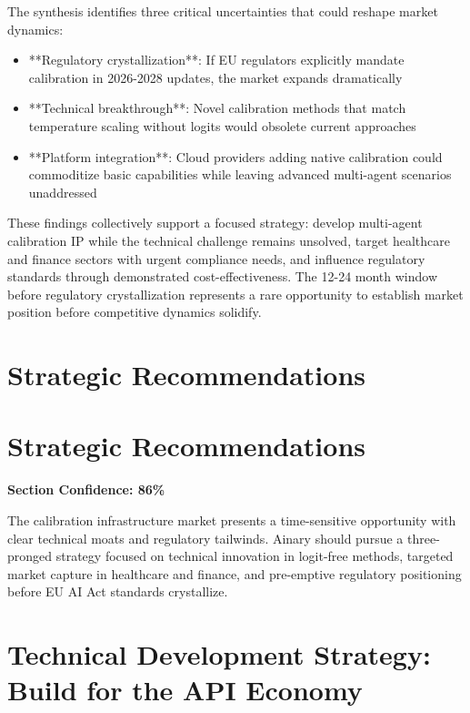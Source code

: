 \documentclass[a4paper,11pt]{article}
\begin{document}
The synthesis identifies three critical uncertainties that could reshape market dynamics:


\begin{itemize}
  \item **Regulatory crystallization**: If EU regulators explicitly mandate calibration in 2026-2028 updates, the market expands dramatically
  \item **Technical breakthrough**: Novel calibration methods that match temperature scaling without logits would obsolete current approaches
  \item **Platform integration**: Cloud providers adding native calibration could commoditize basic capabilities while leaving advanced multi-agent scenarios unaddressed
\end{itemize}

These findings collectively support a focused strategy: develop multi-agent calibration IP while the technical challenge remains unsolved, target healthcare and finance sectors with urgent compliance needs, and influence regulatory standards through demonstrated cost-effectiveness. The 12-24 month window before regulatory crystallization represents a rare opportunity to establish market position before competitive dynamics solidify.

\clearpage
\section{Strategic Recommendations}

\section{Strategic Recommendations}

\textbf{Section Confidence: 86\%}\par

The calibration infrastructure market presents a time-sensitive opportunity with clear technical moats and regulatory tailwinds. Ainary should pursue a three-pronged strategy focused on technical innovation in logit-free methods, targeted market capture in healthcare and finance, and pre-emptive regulatory positioning before EU AI Act standards crystallize.


\section{Technical Development Strategy: Build for the API Economy}
\end{document}
